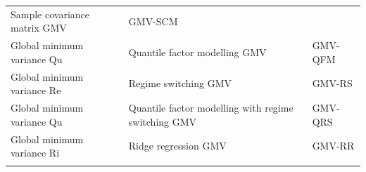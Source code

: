 \documentclass[
]{article}
\begin{document}
\begin{longtable}[]{@{}lll@{}}
\begin{minipage}[t]{0.50\columnwidth}
Sample covariance matrix \textbar{} GMV\strut
\end{minipage} & \begin{minipage}[t]{0.14\columnwidth}\raggedright
GMV-SCM\strut
\end{minipage}\tabularnewline
\begin{minipage}[t]{0.27\columnwidth}\raggedright
Global minimum variance \textbar{} Qu\strut
\end{minipage} & \begin{minipage}[t]{0.50\columnwidth}\raggedright
Quantile factor modelling \textbar{} GMV\strut
\end{minipage} & \begin{minipage}[t]{0.14\columnwidth}\raggedright
GMV-QFM\strut
\end{minipage}\tabularnewline
\begin{minipage}[t]{0.27\columnwidth}\raggedright
Global minimum variance \textbar{} Re\strut
\end{minipage} & \begin{minipage}[t]{0.50\columnwidth}\raggedright
Regime switching \textbar{} GMV\strut
\end{minipage} & \begin{minipage}[t]{0.14\columnwidth}\raggedright
GMV-RS\strut
\end{minipage}\tabularnewline
\begin{minipage}[t]{0.27\columnwidth}\raggedright
Global minimum variance \textbar{} Qu\strut
\end{minipage} & \begin{minipage}[t]{0.50\columnwidth}\raggedright
Quantile factor modelling with regime switching \textbar{} GMV\strut
\end{minipage} & \begin{minipage}[t]{0.14\columnwidth}\raggedright
GMV-QRS\strut
\end{minipage}\tabularnewline
\begin{minipage}[t]{0.27\columnwidth}\raggedright
Global minimum variance \textbar{} Ri\strut
\end{minipage} & \begin{minipage}[t]{0.50\columnwidth}\raggedright
Ridge regression \textbar{} GMV\strut
\end{minipage} & \begin{minipage}[t]{0.14\columnwidth}\raggedright
GMV-RR\strut
\end{minipage}\tabularnewline
\begin{minipage}[t]{0.27\columnwidth}\raggedright

\end{minipage}
\end{longtable}
\end{document}
